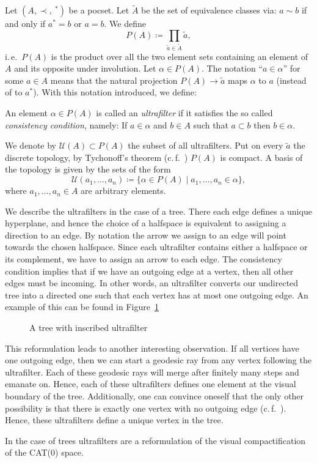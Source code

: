 \begin{defin}[Ultrafilter]
  Let \((A, \prec, \ ^\ast)\) be a pocset. Let \(\tilde A\) be the set of equivalence classes via: \(a \sim b\) if and only if \(a^\ast = b\) or \(a = b\). We define
  \[
    P(A) \coloneqq \prod_{\tilde a \in \tilde A} \tilde a,
  \]
  i.\,e.\ \(P(A)\) is the product over all the two element sets containing an element of \(A\) and its opposite under involution. Let \(\alpha \in P(A)\). The notation \enquote{\(a \in \alpha\)} for some \(a \in A\) means that the natural projection \(P(A) \to \tilde a\) maps \(\alpha\) to \(a\) (instead of to \(a^\ast\)). With this notation introduced, we define:
  
  An element \(\alpha \in P(A)\) is called an \emph{ultrafilter} if it satisfies the so called \emph{consistency condition}, namely: If \(a \in \alpha\) and \(b \in A\) such that \(a \subset b\) then \(b \in \alpha\).

  We denote by \(\mathcal{U}(A) \subset P(A)\) the subset of all ultrafilters. Put on every \(\tilde a\) the discrete topology, by Tychonoff's theorem (c.\,f.\ \cite[Chapter~10]{MR1275831}) \(P(A)\) is compact. A basis of the topology is given by the sets of the form
\[
  \mathcal{U}(a_1,\dots, a_n) \coloneqq \{\alpha \in P(A) \mid a_1, \dots, a_n \in \alpha\},
\]
where \(a_1,\dots, a_n \in A\) are arbitrary elements.
\end{defin}

\begin{bsp}[Trees]
  We describe the ultrafilters in the case of a tree. There each edge defines a unique hyperplane, and hence the choice of a halfspace is equivalent to assigning a direction to an edge. By notation the arrow we assign to an edge will point towards the chosen halfspace. Since each ultrafilter contains either a halfspace or its complement, we have to assign an arrow to each edge. The consistency condition implies that if we have an outgoing edge at a vertex, then all other edges must be incoming. In other words, an ultrafilter converts our undirected tree into a directed one such that each vertex has at most one outgoing edge. An example of this can be found in Figure~\ref{fig:ultrafilter}
  \begin{figure}[htbp]
    \centering
    
    \caption{A tree with inscribed ultrafilter}
    \label{fig:ultrafilter}
  \end{figure}

  This reformulation leads to another interesting observation. If all vertices have one outgoing edge, then we can start a geodesic ray from any vertex following the ultrafilter. Each of these geodesic rays will merge after finitely many steps and emanate on. Hence, each of these ultrafilters defines one element at the visual boundary of the tree. Additionally, one can convince oneself that the only other possibility is that there is exactly one vertex with no outgoing edge (c.\,f.~\cite[14]{sageev-lecture-notes}). Hence, these ultrafilters define a unique vertex in the tree.

  In the case of trees ultrafilters are a reformulation of the visual compactification of the CAT(0) space. 
\end{bsp}

